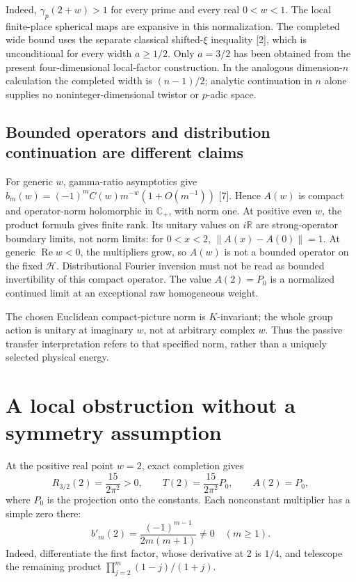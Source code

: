 \documentclass[11pt,letterpaper]{article}
\newcommand{\HH}{\mathcal H}
\newcommand{\CP}{\mathbb C_+}
\newcommand{\Rea}{\operatorname{Re}}
\begin{document}
Indeed, $\gamma_p(2+w)>1$ for every prime and every real $0<w<1$. The local finite-place spherical maps are expansive in this normalization. The completed wide bound uses the separate classical shifted-$\xi$ inequality [2], which is unconditional for every width $a\geq1/2$. Only $a=3/2$ has been obtained from the present four-dimensional local-factor construction. In the analogous dimension-$n$ calculation the completed width is $(n-1)/2$; analytic continuation in $n$ alone supplies no noninteger-dimensional twistor or $p$-adic space.

\subsection*{Bounded operators and distribution continuation are different claims}
For generic $w$, gamma-ratio asymptotics give
$b_m(w)=(-1)^m C(w)m^{-w}(1+O(m^{-1}))$ [7]. Hence $A(w)$ is compact and operator-norm holomorphic in $\CP$, with norm one. At positive even $w$, the product formula gives finite rank. Its unitary values on $i\mathbb R$ are strong-operator boundary limits, not norm limits: for $0<x<2$, $\|A(x)-A(0)\|=1$. At generic $\Rea w<0$, the multipliers grow, so $A(w)$ is not a bounded operator on the fixed $\HH$. Distributional Fourier inversion must not be read as bounded invertibility of this compact operator. The value $A(2)=P_0$ is a normalized continued limit at an exceptional raw homogeneous weight.

The chosen Euclidean compact-picture norm is $K$-invariant; the whole group action is unitary at imaginary $w$, not at arbitrary complex $w$. Thus the passive transfer interpretation refers to that specified norm, rather than a uniquely selected physical energy.

\section{A local obstruction without a symmetry assumption}
At the positive real point $w=2$, exact completion gives
\begin{equation}\label{eq:degeneration}
 R_{3/2}(2)=\frac{15}{2\pi^2}>0,\qquad
 T(2)=\frac{15}{2\pi^2}P_0,\qquad A(2)=P_0,
\end{equation}
where $P_0$ is the projection onto the constants. Each nonconstant multiplier has a simple zero there:
\begin{equation}\label{eq:slope}
 b'_m(2)=\frac{(-1)^{m-1}}{2m(m+1)}\ne0\quad(m\geq1).
\end{equation}
Indeed, differentiate the first factor, whose derivative at 2 is $1/4$, and telescope the remaining product $\prod_{j=2}^{m}(1-j)/(1+j)$.
\end{document}

